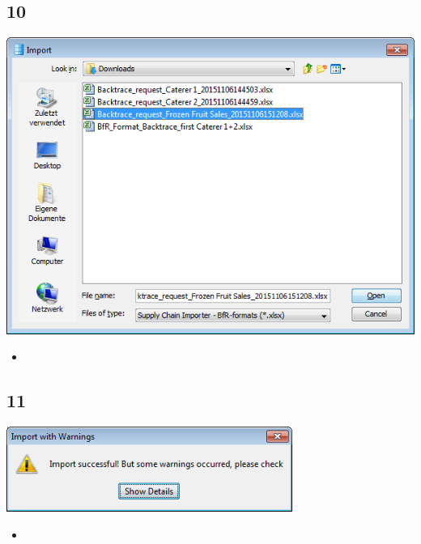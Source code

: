 \documentclass{beamer}
\begin{document}
\subsection{10}
\begin{frame}
	\begin{center}
  		\includegraphics[height=0.5\textheight]{10.png}
	\end{center}
	\begin{itemize}
		\item
	\end{itemize}
\end{frame}

\subsection{11}
\begin{frame}
	\begin{center}
  		\includegraphics[width=0.7\textwidth]{11.png}
	\end{center}
	\begin{itemize}
		\item
	\end{itemize}
\end{frame}
\end{document}
